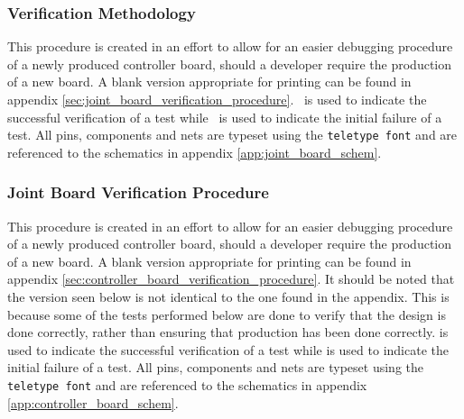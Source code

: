 \subsubsection{Verification Methodology} %
\label{ssub:testing_methodology}

This procedure is created in an effort to allow for an easier debugging procedure of a newly produced controller board, should a developer require the production of a new board.
A blank version appropriate for printing can be found in appendix \ref{sec:joint_board_verification_procedure}.
\cmark ~is used to indicate the successful verification of a test while \xmark ~is used to indicate the initial failure of a test.
All pins, components and nets are typeset using the \texttt{teletype font} and are referenced to the schematics in appendix \ref{app:joint_board_schem}.

\subsubsection{Joint Board Verification Procedure} %
\label{ssub:joint_board_verification_methodology}
This procedure is created in an effort to allow for an easier debugging procedure of a newly produced controller board, should a developer require the production of a new board.
A blank version appropriate for printing can be found in appendix \ref{sec:controller_board_verification_procedure}.
It should be noted that the version seen below is not identical to the one found in the appendix.
This is because some of the tests performed below are done to verify that the design is done correctly, rather than ensuring that production has been done correctly.
\cmark is used to indicate the successful verification of a test while \xmark is used to indicate the initial failure of a test.
All pins, components and nets are typeset using the \texttt{teletype font} and are referenced to the schematics in appendix \ref{app:controller_board_schem}.
